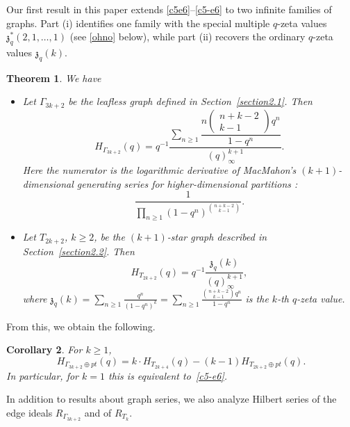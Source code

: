 \documentclass[pdftex]{sigma}
\numberwithin{equation}{section}
\newtheorem{Theorem}{Theorem}[section]
\newtheorem{Corollary}[Theorem]{Corollary}
\theoremstyle{definition}
\begin{document}
Our first result in this paper extends \eqref{c5e6}--\eqref{c5-e6} to two infinite families
of graphs. Part (i) identifies one family with the special multiple
$q$-zeta values $\mathfrak z_q^*(2,1,\dots,1)$ (see \eqref{ohno} below), while part (ii) recovers the
ordinary $q$-zeta values $\mathfrak z_q(k)$.

\begin{Theorem} \label{main}
We have
\begin{itemize}\itemsep=0pt
\item[$(i)$]
Let $\Gamma_{3k+2}$ be the leafless graph defined in Section~{\rm \ref{section2.1}}. Then
\[
H_{\Gamma_{3k+2}}(q)=q^{-1}\dfrac{\sum_{n \geq 1} \dfrac{n \left(\begin{smallmatrix}n+k-2\\k-1\end{smallmatrix}\right) q^n}{1-q^n}
}{(q)_\infty^{k+1}}.
\]
Here the numerator is the logarithmic derivative of MacMahon's $(k+1)$-dimensional generating series for higher-dimensional partitions {\rm \cite{Andrews0}}:
\[
\frac{1}{\prod_{n \geq 1} (1-q^n)^{{n+k-2 \choose k-1}}}.
\]
\item[$(ii)$]
Let $T_{2k+2}$, $k \geq 2$, be the $(k+1)$-star graph described in Section~{\rm \ref{section2.2}}. Then
\[
H_{T_{2k+2}}(q)=q^{-1}\frac{\mathfrak{z}_{q}(k)}{(q)_\infty^{k+1}},
\]
where $\mathfrak{z}_{q}(k)=\sum_{n \geq 1} \frac{q^n}{(1-q^n)^k}=\sum_{n \geq 1} \frac{{n+k-2 \choose k-1}q^n}{1-q^n}$ is the $k$-th $q$-zeta value.
\end{itemize}
\end{Theorem}
From this, we obtain the following.

\begin{Corollary} For $k \geq 1$,
\[
H_{\Gamma_{3k+2} \oplus pt}(q)=k \cdot H_{T_{2k+4}}(q)-(k-1)H_{T_{2k+2} \oplus pt }(q).
\]
In particular, for $k=1$ this is equivalent to~\eqref{c5-e6}.
\end{Corollary}
In addition to results about graph series, we also analyze Hilbert series of the edge ideals $R_{\Gamma_{3k+2}}$ and of $R_{T_k}$.
\end{document}

